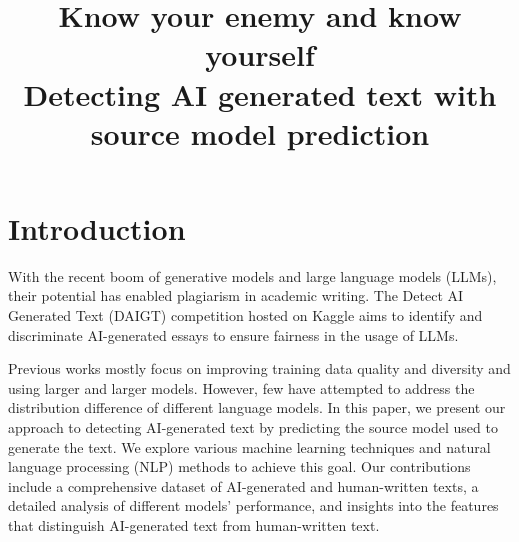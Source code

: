 \documentclass[conference]{IEEEtran}
\begin{document}
\title{Know your enemy and know yourself \\ {\LARGE Detecting AI generated text with source model prediction}}

\author{
  \and
  \and
  \and
}

\maketitle

\section{Introduction}

With the recent boom of generative models and large language models (LLMs), their potential has enabled plagiarism in academic writing. The Detect AI Generated Text (DAIGT) competition hosted on Kaggle \cite{daigt} aims to identify and discriminate AI-generated essays to ensure fairness in the usage of LLMs.

Previous works mostly focus on improving training data quality and diversity and using larger and larger models. However, few have attempted to address the distribution difference of different language models. In this paper, we present our approach to detecting AI-generated text by predicting the source model used to generate the text. We explore various machine learning techniques and natural language processing (NLP) methods to achieve this goal. Our contributions include a comprehensive dataset of AI-generated and human-written texts, a detailed analysis of different models' performance, and insights into the features that distinguish AI-generated text from human-written text.
\end{document}
